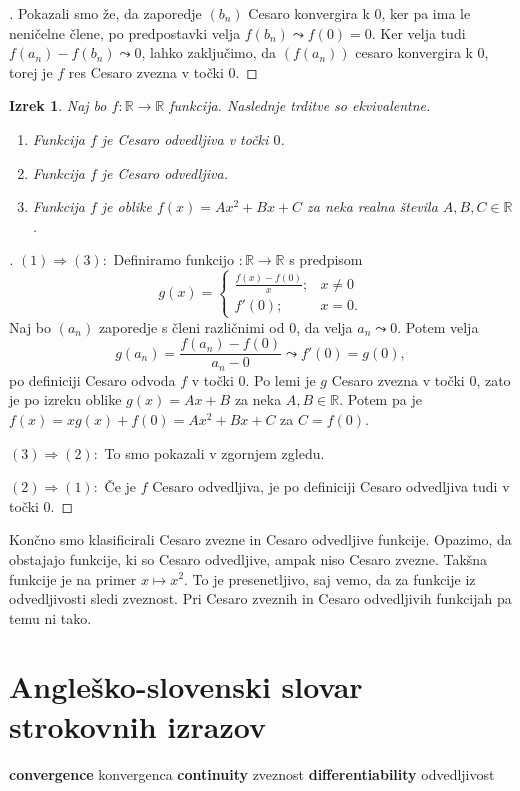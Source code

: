 \documentclass[a4paper,12pt]{article}
\theoremstyle{definition}
\theoremstyle{plain}
\newtheorem{izrek}{Izrek}
\newenvironment{dokaz}{\begin{proof}[\bfseries\upshape\proofname]}{\end{proof}}
\newcommand{\geslo}[2]{\noindent \textbf{#1} \quad #2 \hfill \break}
\begin{document}
\begin{dokaz}
    Pokazali smo že, da zaporedje $(b_n)$ Cesaro konvergira k $0$, ker pa ima le neničelne člene, po predpostavki velja $f(b_n) \leadsto f(0) = 0$. Ker velja tudi $f(a_n) - f(b_n) \leadsto 0$, lahko zaključimo, da $(f(a_n))$ cesaro konvergira k $0$, torej je $f$ res Cesaro zvezna v točki $0$.
\end{dokaz}

\begin{izrek}
    Naj bo $f: \mathbb{R} \rightarrow \mathbb{R}$ funkcija. Naslednje trditve so ekvivalentne.
    \begin{enumerate}
        \item Funkcija $f$ je Cesaro odvedljiva v točki $0$.
        \item Funkcija $f$ je Cesaro odvedljiva.
        \item Funkcija $f$ je oblike $f(x) = Ax^2 + Bx + C$ za neka realna števila $A, B, C \in \mathbb{R}$.
    \end{enumerate}
\end{izrek}
\begin{dokaz}
    $(1) \Rightarrow (3): $ Definiramo funkcijo $: \mathbb{R} \rightarrow \mathbb{R}$ s predpisom 
    $$
    g(x) = \begin{cases}
        \frac{f(x)-f(0)}{x}; & x \neq 0\\
        f'(0); & x = 0.
    \end{cases}
    $$
    Naj bo $(a_n)$ zaporedje s členi različnimi od $0$, da velja $a_n \leadsto 0$. Potem velja 
    $$g(a_n) = \frac{f(a_n)-f(0)}{a_n-0} \leadsto f'(0) = g(0),$$
    po definiciji Cesaro odvoda $f$ v točki $0$. Po lemi je $g$ Cesaro zvezna v točki $0$, zato je po izreku oblike $g(x) = Ax + B$ za neka $A, B \in \mathbb{R}$. Potem pa je 
    $f(x) = xg(x) + f(0) = Ax^2 + Bx + C$ za $C = f(0)$.

    $(3) \Rightarrow (2): $ To smo pokazali v zgornjem zgledu.

    $(2) \Rightarrow (1): $ Če je $f$ Cesaro odvedljiva, je po definiciji Cesaro odvedljiva tudi v točki $0$.
\end{dokaz}
Končno smo klasificirali Cesaro zvezne in Cesaro odvedljive funkcije. Opazimo, da obstajajo funkcije, ki so Cesaro odvedljive, ampak niso Cesaro zvezne. Takšna funkcije je na primer $x \mapsto x^2$. To je presenetljivo, saj vemo, da za funkcije iz odvedljivosti sledi zveznost. Pri Cesaro zveznih in Cesaro odvedljivih funkcijah pa temu ni tako.



\section*{Angleško-slovenski slovar strokovnih izrazov}
\geslo{convergence}{konvergenca}
\geslo{continuity}{zveznost}
\geslo{differentiability}{odvedljivost}
\end{document}
